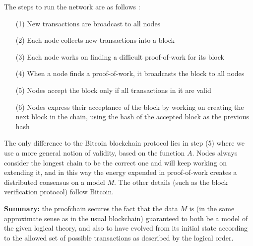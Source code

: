 \documentclass[english,letter paper,12pt,reqno]{article}
\theoremstyle{example}
\newtheorem{remark}[theorem]{Remark}
\begin{document}
The steps to run the network are as follows \cite[\S 5]{satoshi}:
\begin{itemize}
\item[(1)] New transactions are broadcast to all nodes
\item[(2)] Each node collects new transactions into a block
\item[(3)] Each node works on finding a difficult proof-of-work for its block
\item[(4)] When a node finds a proof-of-work, it broadcasts the block to all nodes
\item[(5)] Nodes accept the block only if all transactions in it are valid
\item[(6)] Nodes express their acceptance of the block by working on creating the next block in the chain, using the hash of the accepted block as the previous hash
\end{itemize}
The only difference to the Bitcoin blockchain protocol lies in step (5) where we use a more general notion of validity, based on the function $A$. Nodes always consider the longest chain to be the correct one and will keep working on extending it, and in this way the energy expended in proof-of-work creates a distributed consensus on a model $M$. The other details (such as the block verification protocol) follow Bitcoin.
\vspace{0.2cm}

\textbf{Summary:} the proofchain secures the fact that the data $M$ is (in the same approximate sense as in the usual blockchain) guaranteed to both be a model of the given logical theory, and also to have evolved from its initial state according to the allowed set of possible transactions as described by the logical order.
\\

\end{document}

